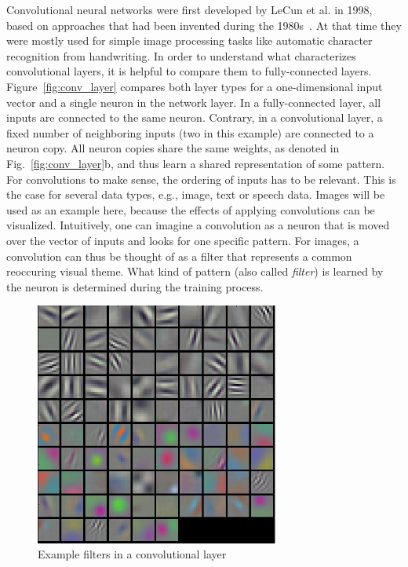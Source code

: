 Convolutional neural networks were first developed by LeCun et al. in 1998,
based on approaches that had been invented during the 1980s~\cite{Fukushima1980, LeCun1998}.
At that time they were mostly used for simple image processing tasks like
automatic character recognition from handwriting.
In order to understand what characterizes convolutional layers, it is helpful
to compare them to fully-connected layers.
Figure~\ref{fig:conv_layer} compares both layer types for a one-dimensional
input vector and a single neuron in the network layer.
In a fully-connected layer, all inputs are connected to the same neuron.
Contrary, in a convolutional layer, a fixed number of neighboring inputs (two in this example)
are connected to a neuron copy.
All neuron copies share the same weights, as denoted in Fig.~\ref{fig:conv_layer}b,
and thus learn a shared representation of some pattern.
For convolutions to make sense, the ordering of inputs has to be relevant.
This is the case for several data types, e.g., image, text or speech data.
Images will be used as an example here, because the effects of applying
convolutions can be visualized.
Intuitively, one can imagine a convolution as a neuron that is moved over the
vector of inputs and looks for one specific pattern.
For images, a convolution can thus be thought of as a filter that represents
a common reoccuring visual theme.
What kind of pattern (also called \textit{filter}) is learned by the neuron is
determined during the training process.

\begin{figure}[h]
  \centering
  \includegraphics[height=8cm]{img/conv_filters.jpeg}
  \caption[Example filters in a convolutional layer]{Example filters in a convolutional layer~\cite{Krizhevsky2012}}
\label{fig:conv_examples}
\end{figure}

